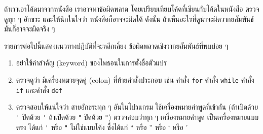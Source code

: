 
ถ้าเราเอาโค้ดมาจากหนังสือ
เราอาจหาข้อผิดพลาด โดยเปรียบเทียบโค้ดที่เขียนกับโค้ดในหนังสือ
ตรวจดูทุก ๆ อักขระ
และให้นึกในใจว่า หนังสือก็อาจจะผิดได้
ดังนั้น ถ้าเห็นอะไรที่ดูน่าจะผิดวากยสัมพันธ์ มันก็อาจจะผิดจริง ๆ


รายการต่อไปนี้แสดงแนวทางปฎิบัติที่จะหลีกเลี่ยง ข้อผิดพลาดเชิงวากยสัมพันธ์ที่พบบ่อย ๆ


\begin{enumerate}


\item อย่าใช้คำสำคัญ (keyword) ของไพธอนในการตั้งชื่อตัวแปร



\item ตรวจดูว่า มีเครื่องหมายจุดคู่ (colon) ที่ท้ายคำสั่งประกอบ เช่น คำสั่ง \texttt{for} คำสั่ง \texttt{while} คำสั่ง
\texttt{if} และคำสั่ง \texttt{def}



\item ตรวจสอบให้แน่ใจว่า สายอักขระทุก ๆ อันในโปรแกรม ใช้เครื่องหมายคำพูดที่เข้ากัน
(ถ้าเปิดด้วย \verb|'| ปิดด้วย \verb|'|
ถ้าเปิดด้วย \verb|"| ปิดด้วย \verb|"|)
ตรวจสอบว่าทุก ๆ เครื่องหมายคำพูด เป็นเครื่องหมายแบบตรง ได้แก่ \verb|'| หรือ \verb|"| ไม่ใช่แบบโค้ง ซึ่งได้แก่ `` หรือ '' หรือ ` หรือ '




\end{enumerate}
